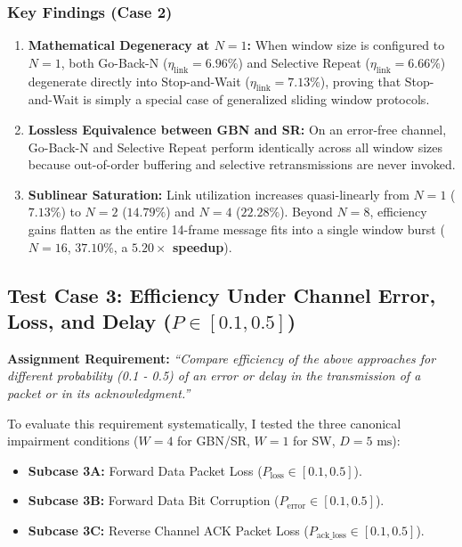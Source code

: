 \documentclass[11pt,a4paper]{article}
\begin{document}
\subsubsection{Key Findings (Case 2)}
\begin{enumerate}
    \item \textbf{Mathematical Degeneracy at $N=1$:} When window size is configured to $N = 1$, both Go-Back-N ($\eta_{\text{link}} = 6.96\%$) and Selective Repeat ($\eta_{\text{link}} = 6.66\%$) degenerate directly into Stop-and-Wait ($\eta_{\text{link}} = 7.13\%$), proving that Stop-and-Wait is simply a special case of generalized sliding window protocols.
    \item \textbf{Lossless Equivalence between GBN and SR:} On an error-free channel, Go-Back-N and Selective Repeat perform identically across all window sizes because out-of-order buffering and selective retransmissions are never invoked.
    \item \textbf{Sublinear Saturation:} Link utilization increases quasi-linearly from $N=1$ ($7.13\%$) to $N=2$ ($14.79\%$) and $N=4$ ($22.28\%$). Beyond $N=8$, efficiency gains flatten as the entire 14-frame message fits into a single window burst ($N=16$, $37.10\%$, a \textbf{$5.20\times$ speedup}).
\end{enumerate}

\FloatBarrier
\subsection{Test Case 3: Efficiency Under Channel Error, Loss, and Delay ($P \in [0.1, 0.5]$)}
\textbf{Assignment Requirement:} \textit{``Compare efficiency of the above approaches for different probability (0.1 - 0.5) of an error or delay in the transmission of a packet or in its acknowledgment.''}

To evaluate this requirement systematically, I tested the three canonical impairment conditions ($W = 4$ for GBN/SR, $W = 1$ for SW, $D = 5\text{ ms}$):
\begin{itemize}
    \item \textbf{Subcase 3A:} Forward Data Packet Loss ($P_{\text{loss}} \in [0.1, 0.5]$).
    \item \textbf{Subcase 3B:} Forward Data Bit Corruption ($P_{\text{error}} \in [0.1, 0.5]$).
    \item \textbf{Subcase 3C:} Reverse Channel ACK Packet Loss ($P_{\text{ack\_loss}} \in [0.1, 0.5]$).
\end{itemize}
\end{document}

